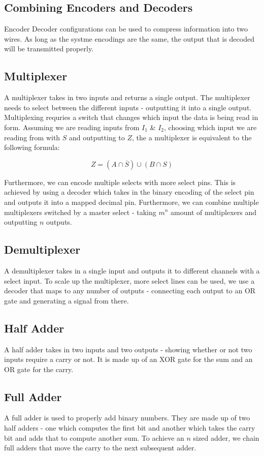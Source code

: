 \documentclass[]{report}
\begin{document}
\subsection{Combining Encoders and Decoders}
Encoder Decoder configurations can be used to compress information into two wires. As long as the systme encodings are the same, the output that is decoded will be transmitted properly.

\subsection{Multiplexer}
A multiplexer takes in two inputs and returns a single output. The multiplexer needs to select between the different inputs - outputting it into a single output. Multiplexing requries a switch that changes which input the data is being read in form. Assuming we are reading inputs from $I_1$ \& $I_2$, choosing which input we are reading from with $S$ and outputting to $Z$, the a multiplexer is equivalent to the following formula:

\[
    Z = (A \cap \overline{S}) \cup (B \cap S)  
\]

Furthermore, we can encode multiple selects with more select pins. This is achieved by using a decoder which takes in the binary encoding of the select pin and outputs it into a mapped decimal pin. Furthermore, we can combine multiple multiplexers switched by a master select - taking $m^n$ amount of multiplexers and outputting $n$ outputs.

\subsection{Demultiplexer}
A demultiplexer takes in a single input and outputs it to different channels with a select input. To scale up the multiplexer, more select lines can be used, we use a decoder that maps to any number of outputs - connecting each output to an OR gate and generating a signal from there.

\subsection{Half Adder}
A half adder takes in two inputs and two outputs - showing whether or not two inputs require a carry or not. It is made up of an XOR gate for the sum and an OR gate for the carry. 

\subsection{Full Adder}
A full adder is used to properly add binary numbers. They are made up of two half adders - one which computes the first bit and another which takes the carry bit and adds that to compute another sum. To achieve an $n$ sized adder, we chain full adders that move the carry to the next subsequent adder. 
\end{document}
